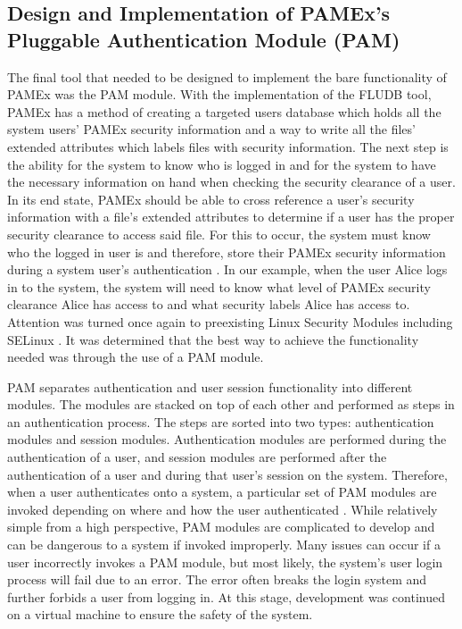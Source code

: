 \subsection{Design and Implementation of PAMEx's Pluggable Authentication Module (PAM)}
\par 
\vspace{\baselineskip}
\hspace{1em}
The final tool that needed to be designed to implement the bare 
functionality of PAMEx was the PAM module. With the implementation of 
the FLUDB tool, PAMEx has a method of creating a targeted users 
database which holds all the system users’ PAMEx security information 
and a way to write all the files’ extended attributes which labels 
files with security information. The next step is the ability for the 
system to know who is logged in and for the system to have the 
necessary information on hand when checking the security clearance of a 
user. In its end state, PAMEx should be able to cross reference a 
user’s security information with a file’s extended attributes to 
determine if a user has the proper security clearance to access said 
file. For this to occur, the system must know who the logged in user is 
and therefore, store their PAMEx security information during a system user's authentication \cite{lauber}. 
In our example, when the user Alice logs in to the system, the 
system will need to know what level of PAMEx security clearance Alice 
has access to and what security labels Alice has access to. 
Attention was turned once again to preexisting Linux Security 
Modules including SELinux \cite{selinux}. It was determined that the best way to 
achieve the functionality needed was through the use of a PAM module.  

PAM separates authentication and user session functionality into 
different modules. The modules are stacked on top of each other and 
performed as steps in an authentication process. The steps are sorted into two 
types: authentication modules and session modules. Authentication 
modules are performed during the authentication of a user, and session 
modules are performed after the authentication of a user and during 
that user’s session on the system. Therefore, when a user authenticates 
onto a system, a particular set of PAM modules are invoked depending on 
where and how the user authenticated \cite{lauber}. While relatively simple from a 
high perspective, PAM modules are complicated to develop and can be 
dangerous to a system if invoked improperly. Many issues can occur if 
a user incorrectly invokes a PAM module, but most likely, the system’s 
user login process will fail due to an error. The error often breaks 
the login system and further forbids a user from logging in. At this 
stage, development was continued on a virtual machine 
to ensure the safety of the system.


